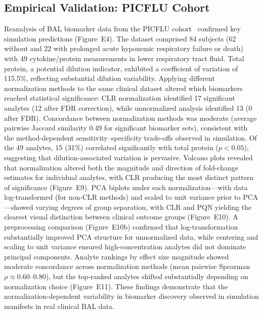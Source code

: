 \documentclass[12pt]{article}
\begin{document}
\subsection{Empirical Validation: PICFLU Cohort}

Reanalysis of BAL biomarker data from the PICFLU cohort~\cite{Boyd2020} confirmed key simulation predictions (Figure~E4). The dataset comprised 84 subjects (62 without and 22 with prolonged acute hypoxemic respiratory failure or death) with 49 cytokine/protein measurements in lower respiratory tract fluid. Total protein, a potential dilution indicator, exhibited a coefficient of variation of 115.5\%, reflecting substantial dilution variability. Applying different normalization methods to the same clinical dataset altered which biomarkers reached statistical significance: CLR normalization identified 17 significant analytes (12 after FDR correction), while unnormalized analysis identified 13 (0 after FDR). Concordance between normalization methods was moderate (average pairwise Jaccard similarity 0.49 for significant biomarker sets), consistent with the method-dependent sensitivity--specificity trade-offs observed in simulation. Of the 49 analytes, 15 (31\%) correlated significantly with total protein ($p < 0.05$), suggesting that dilution-associated variation is pervasive. Volcano plots revealed that normalization altered both the magnitude and direction of fold-change estimates for individual analytes, with CLR producing the most distinct pattern of significance (Figure~E9). PCA biplots under each normalization---with data log-transformed (for non-CLR methods) and scaled to unit variance prior to PCA---showed varying degrees of group separation, with CLR and PQN yielding the clearest visual distinction between clinical outcome groups (Figure~E10). A preprocessing comparison (Figure~E10b) confirmed that log-transformation substantially improved PCA structure for unnormalized data, while centering and scaling to unit variance ensured high-concentration analytes did not dominate principal components. Analyte rankings by effect size magnitude showed moderate concordance across normalization methods (mean pairwise Spearman $\rho \approx 0.60$--$0.80$), but the top-ranked analytes shifted substantially depending on normalization choice (Figure~E11). These findings demonstrate that the normalization-dependent variability in biomarker discovery observed in simulation manifests in real clinical BAL data.
\end{document}
